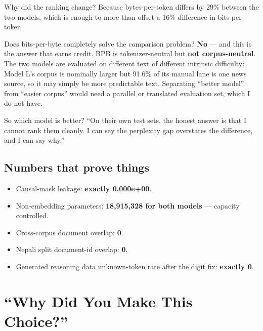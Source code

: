 \documentclass[11pt]{report}
\begin{document}
\begin{qabox}{Why did the ranking change?}
Because bytes-per-token differs by 29\% between the two models, which is enough
to more than offset a 16\% difference in bits per token.
\end{qabox}

\begin{qabox}{Does bits-per-byte completely solve the comparison problem?}
\textbf{No} --- and this is the answer that earns credit. BPB is
tokenizer-neutral but \textbf{not corpus-neutral}. The two models are evaluated
on different text of different intrinsic difficulty: Model L's corpus is
nominally larger but 91.6\% of its manual lane is one news source, so it may
simply be more predictable text. Separating ``better model'' from ``easier
corpus'' would need a parallel or translated evaluation set, which I do not
have.
\end{qabox}

\begin{qabox}{So which model is better?}
``On their own test sets, the honest answer is that I cannot rank them cleanly.
I can say the perplexity gap overstates the difference, and I can say why.''
\end{qabox}

\section{Numbers that prove things}

\begin{itemize}
\item Causal-mask leakage: \textbf{exactly 0.000e+00}.
\item Non-embedding parameters: \textbf{18,915,328 for both models} --- capacity
controlled.
\item Cross-corpus document overlap: \textbf{0}.
\item Nepali split document-id overlap: \textbf{0}.
\item Generated reasoning data unknown-token rate after the digit fix:
\textbf{exactly 0}.
\end{itemize}

\chapter{``Why Did You Make This Choice?''}
\end{document}
